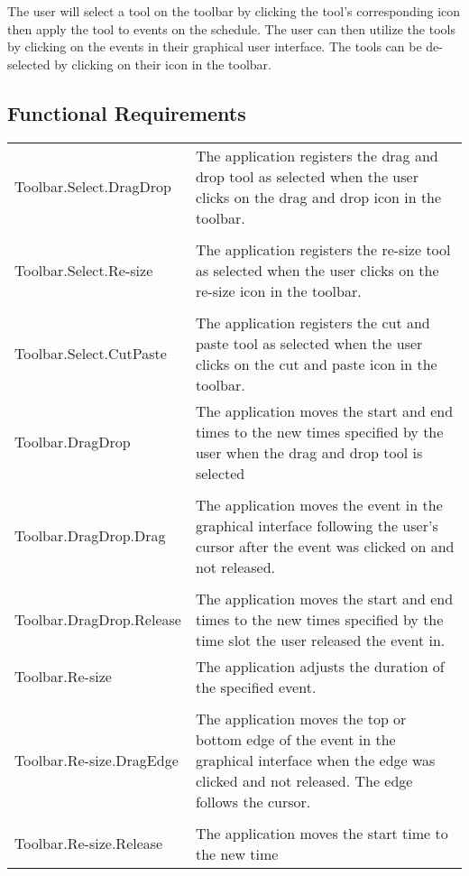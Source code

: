 \documentclass{scrreprt}
\begin{document}
The user will select a tool on the toolbar by clicking the tool's corresponding icon
then apply the tool to events on the schedule. The user can then utilize the tools 
by clicking on the events in their graphical user interface. The tools can be de-selected
by clicking on their icon in the toolbar.

\subsection{Functional Requirements}
\begin{center}
    \begin{longtable}{ | p{6cm} | p{9cm} | }
    \hline
    Toolbar.Select.DragDrop & The application registers the drag and drop tool
    as selected when the user clicks on the drag and drop icon in the toolbar.\\
    & \\
    Toolbar.Select.Re-size & The application registers the re-size tool as selected
    when the user clicks on the re-size icon in the toolbar.\\
    & \\
    Toolbar.Select.CutPaste & The application registers the cut and paste tool
    as selected when the user clicks on the cut and paste icon in the toolbar.\\
    \hline
    Toolbar.DragDrop & The application moves the start and end times to the new 
    times specified by the user when the drag and drop tool is selected\\
    & \\ 
    Toolbar.DragDrop.Drag & The application moves the event in the graphical
    interface following the user's cursor after the event was clicked on and
    not released.\\
    & \\
    Toolbar.DragDrop.Release & The application moves the start and end times to
    the new times specified by the time slot the user released the event in.\\
    \hline
    Toolbar.Re-size & The application adjusts the duration of the specified event.\\
    & \\
    Toolbar.Re-size.DragEdge & The application moves the top or bottom edge
    of the event in the graphical interface when the edge was clicked and not 
    released. The edge follows the cursor.\\
    & \\ 
    Toolbar.Re-size.Release & The application moves the start time to the new time

\end{longtable}
\end{center}
\end{document}
